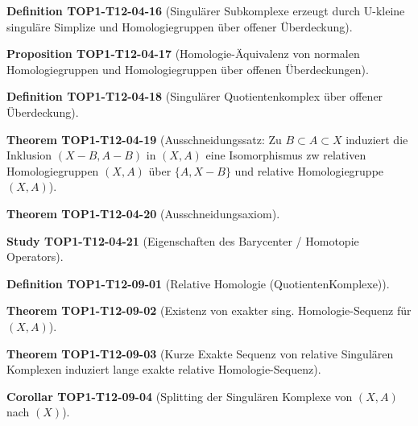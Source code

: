 \documentclass[10pt, letterpaper]{article}
\newcommand{\CustomHeading}[3]{%
  \par\medskip\noindent%
  \textbf{#1 #2} \textnormal{(#3)}.\enskip%
}
\newenvironment{DEF}[2]{\CustomHeading{Definition}{#1}{#2}}{}
\newenvironment{PROP}[2]{\CustomHeading{Proposition}{#1}{#2}}{}
\newenvironment{THEO}[2]{\CustomHeading{Theorem}{#1}{#2}}{}
\newenvironment{KORO}[2]{\CustomHeading{Corollar}{#1}{#2}}{}
\newenvironment{STUD}[2]{\CustomHeading{Study}{#1}{#2}}{}
\begin{document}
\begin{DEF}{TOP1-T12-04-16}{Singulärer Subkomplexe erzeugt durch U-kleine singuläre Simplize und Homologiegruppen über offener Überdeckung}
\end{DEF}

\begin{PROP}{TOP1-T12-04-17}{Homologie-Äquivalenz von normalen Homologiegruppen und Homologiegruppen über offenen Überdeckungen}
\end{PROP}

\begin{DEF}{TOP1-T12-04-18}{Singulärer Quotientenkomplex über offener Überdeckung}
\end{DEF}

\begin{THEO}{TOP1-T12-04-19}{Ausschneidungssatz: Zu $B\subset A\subset X$ induziert die Inklusion $(X-B,A-B)$ in $(X,A)$ eine Isomorphismus zw relativen Homologiegruppen $(X,A)$ über $\{A,X-B\}$ und relative Homologiegruppe $(X,A)$}
\end{THEO}

\begin{THEO}{TOP1-T12-04-20}{Ausschneidungsaxiom}
\end{THEO}

\begin{STUD}{TOP1-T12-04-21}{Eigenschaften des Barycenter / Homotopie Operators}
\end{STUD}

\begin{DEF}{TOP1-T12-09-01}{Relative Homologie (QuotientenKomplexe)}
\end{DEF}

\begin{THEO}{TOP1-T12-09-02}{Existenz von exakter sing. Homologie-Sequenz für $(X,A)$}
\end{THEO}

\begin{THEO}{TOP1-T12-09-03}{Kurze Exakte Sequenz von relative Singulären Komplexen induziert lange exakte relative Homologie-Sequenz}
\end{THEO}

\begin{KORO}{TOP1-T12-09-04}{Splitting der Singulären Komplexe von $(X,A)$ nach $(X)$}
\end{KORO}
\end{document}
